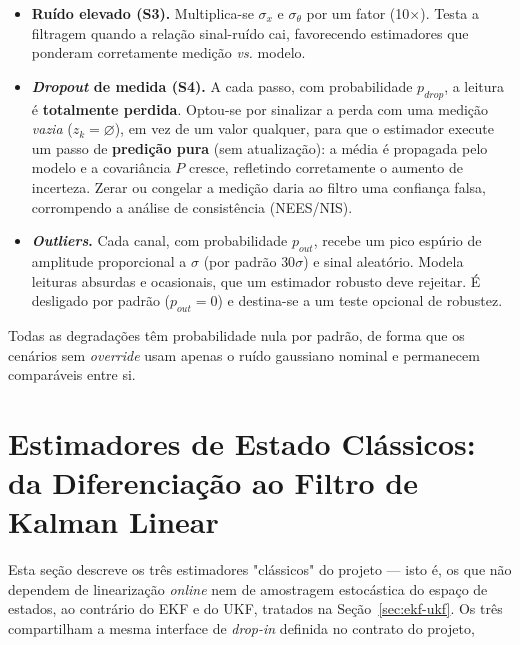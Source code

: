 \documentclass[brazil, 12pt]{article}
\begin{document}
\begin{itemize}
  \item \textbf{Ruído elevado (S3).} Multiplica-se $\sigma_x$ e $\sigma_\theta$
  por um fator (10$\times$). Testa a filtragem quando a relação sinal-ruído
  cai, favorecendo estimadores que ponderam corretamente medição \emph{vs.}
  modelo.

  \item \textbf{\emph{Dropout} de medida (S4).} A cada passo, com probabilidade
  $p_{drop}$, a leitura é \textbf{totalmente perdida}. Optou-se por sinalizar a
  perda com uma medição \emph{vazia} ($z_k=\varnothing$), em vez de um valor
  qualquer, para que o estimador execute um passo de \textbf{predição pura} (sem
  atualização): a média é propagada pelo modelo e a covariância $P$ cresce,
  refletindo corretamente o aumento de incerteza. Zerar ou congelar a medição
  daria ao filtro uma confiança falsa, corrompendo a análise de consistência
  (NEES/NIS).

  \item \textbf{\emph{Outliers}.} Cada canal, com probabilidade $p_{out}$,
  recebe um pico espúrio de amplitude proporcional a $\sigma$ (por padrão
  $30\sigma$) e sinal aleatório. Modela leituras absurdas e ocasionais, que um
  estimador robusto deve rejeitar. É desligado por padrão
  ($p_{out}=0$) e destina-se a um teste opcional de robustez.
\end{itemize}

Todas as degradações têm probabilidade nula por padrão, de forma que os cenários
sem \emph{override} usam apenas o ruído gaussiano nominal e permanecem
comparáveis entre si.

\section{Estimadores de Estado Clássicos: da Diferenciação ao Filtro de Kalman Linear}
\label{sec:estimadores-classicos}

Esta seção descreve os três estimadores "clássicos" do projeto — isto é, os que
não dependem de linearização \emph{online} nem de amostragem estocástica do
espaço de estados, ao contrário do EKF e do UKF, tratados na
Seção~\ref{sec:ekf-ukf}. Os três compartilham a mesma interface de \emph{drop-in} definida
no contrato do projeto,
\end{document}
